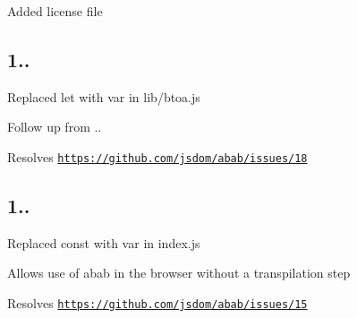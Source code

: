
\begin{DoxyItemize}
\item Added license file
\end{DoxyItemize}

\subsection*{1..}


\begin{DoxyItemize}
\item Replaced {\ttfamily let} with {\ttfamily var} in {\ttfamily lib/btoa.\+js}
\begin{DoxyItemize}
\item Follow up from {..}
\item Resolves \href{https://github.com/jsdom/abab/issues/18}{\tt https\+://github.\+com/jsdom/abab/issues/18}
\end{DoxyItemize}
\end{DoxyItemize}

\subsection*{1..}


\begin{DoxyItemize}
\item Replaced {\ttfamily const} with {\ttfamily var} in {\ttfamily index.\+js}
\begin{DoxyItemize}
\item Allows use of {\ttfamily abab} in the browser without a transpilation step
\item Resolves \href{https://github.com/jsdom/abab/issues/15}{\tt https\+://github.\+com/jsdom/abab/issues/15} 
\end{DoxyItemize}
\end{DoxyItemize}